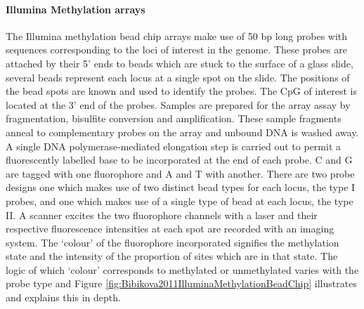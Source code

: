 \documentclass[
]{book}
\begin{document}
\hypertarget{illumina-methylation-arrays}{%
\paragraph{Illumina Methylation arrays}\label{illumina-methylation-arrays}}

The Illumina methylation bead chip arrays make use of 50 bp long probes with sequences corresponding to the loci of interest in the genome. These probes are attached by their 5' ends to beads which are stuck to the surface of a glass slide, several beads represent each locus at a single spot on the slide. The positions of the bead spots are known and used to identify the probes. The CpG of interest is located at the 3' end of the probes. Samples are prepared for the array assay by fragmentation, bisulfite conversion and amplification. These sample fragments anneal to complementary probes on the array and unbound DNA is washed away. A single DNA polymerase-mediated elongation step is carried out to permit a fluorescently labelled base to be incorporated at the end of each probe. C and G are tagged with one fluorophore and A and T with another. There are two probe designs one which makes use of two distinct bead types for each locus, the type I probes, and one which makes use of a single type of bead at each locus, the type II. A scanner excites the two fluorophore channels with a laser and their respective fluorescence intensities at each spot are recorded with an imaging system. The `colour' of the fluorophore incorporated signifies the methylation state and the intensity of the proportion of sites which are in that state. The logic of which `colour' corresponds to methylated or unmethylated varies with the probe type and Figure \ref{fig:Bibikova2011IlluminaMethylationBeadChip} illustrates and explains this in depth.
\end{document}
